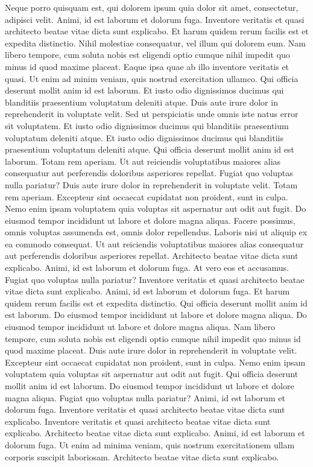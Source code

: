 \documentclass[
]{report}
\begin{document}
Neque porro quisquam est, qui dolorem ipsum quia dolor sit amet,
consectetur, adipisci velit. Animi, id est laborum et dolorum fuga.
Inventore veritatis et quasi architecto beatae vitae dicta sunt
explicabo. Et harum quidem rerum facilis est et expedita distinctio.
Nihil molestiae consequatur, vel illum qui dolorem eum. Nam libero
tempore, cum soluta nobis est eligendi optio cumque nihil impedit quo
minus id quod maxime placeat. Eaque ipsa quae ab illo inventore
veritatis et quasi. Ut enim ad minim veniam, quis nostrud exercitation
ullamco. Qui officia deserunt mollit anim id est laborum. Et iusto odio
dignissimos ducimus qui blanditiis praesentium voluptatum deleniti
atque. Duis aute irure dolor in reprehenderit in voluptate velit. Sed ut
perspiciatis unde omnis iste natus error sit voluptatem. Et iusto odio
dignissimos ducimus qui blanditiis praesentium voluptatum deleniti
atque. Et iusto odio dignissimos ducimus qui blanditiis praesentium
voluptatum deleniti atque. Qui officia deserunt mollit anim id est
laborum. Totam rem aperiam. Ut aut reiciendis voluptatibus maiores alias
consequatur aut perferendis doloribus asperiores repellat. Fugiat quo
voluptas nulla pariatur? Duis aute irure dolor in reprehenderit in
voluptate velit. Totam rem aperiam. Excepteur sint occaecat cupidatat
non proident, sunt in culpa. Nemo enim ipsam voluptatem quia voluptas
sit aspernatur aut odit aut fugit. Do eiusmod tempor incididunt ut
labore et dolore magna aliqua. Facere possimus, omnis voluptas assumenda
est, omnis dolor repellendus. Laboris nisi ut aliquip ex ea commodo
consequat. Ut aut reiciendis voluptatibus maiores alias consequatur aut
perferendis doloribus asperiores repellat. Architecto beatae vitae dicta
sunt explicabo. Animi, id est laborum et dolorum fuga. At vero eos et
accusamus. Fugiat quo voluptas nulla pariatur? Inventore veritatis et
quasi architecto beatae vitae dicta sunt explicabo. Animi, id est
laborum et dolorum fuga. Et harum quidem rerum facilis est et expedita
distinctio. Qui officia deserunt mollit anim id est laborum. Do eiusmod
tempor incididunt ut labore et dolore magna aliqua. Do eiusmod tempor
incididunt ut labore et dolore magna aliqua. Nam libero tempore, cum
soluta nobis est eligendi optio cumque nihil impedit quo minus id quod
maxime placeat. Duis aute irure dolor in reprehenderit in voluptate
velit. Excepteur sint occaecat cupidatat non proident, sunt in culpa.
Nemo enim ipsam voluptatem quia voluptas sit aspernatur aut odit aut
fugit. Qui officia deserunt mollit anim id est laborum. Do eiusmod
tempor incididunt ut labore et dolore magna aliqua. Fugiat quo voluptas
nulla pariatur? Animi, id est laborum et dolorum fuga. Inventore
veritatis et quasi architecto beatae vitae dicta sunt explicabo.
Inventore veritatis et quasi architecto beatae vitae dicta sunt
explicabo. Architecto beatae vitae dicta sunt explicabo. Animi, id est
laborum et dolorum fuga. Ut enim ad minima veniam, quis nostrum
exercitationem ullam corporis suscipit laboriosam. Architecto beatae
vitae dicta sunt explicabo.
\end{document}
